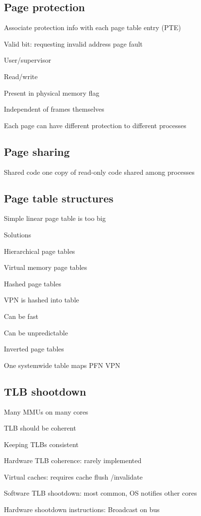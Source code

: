 \subsection{Page protection}
\enumstart
	\item Associate protection info with each page table entry (PTE)
	\enumstart
		\item Valid bit: requesting invalid address \arrow page fault
		\item User/supervisor
		\item Read/write
		\item Present in physical memory flag
	\enumend
	\item Independent of frames themselves
	\item Each page can have different protection to different processes
\enumend

\subsection{Page sharing}
\enumstart
	\item Shared code \arrow one copy of read-only code shared among processes
\enumend

\subsection{Page table structures}
\enumstart
	\item Simple linear page table is too big
	\item Solutions
	\enumstart
		\item Hierarchical page tables
		\item Virtual memory page tables
		\item Hashed page tables
		\enumstart
			\item VPN is hashed into table
			\item Can be fast
			\item Can be unpredictable
		\enumend
		\item Inverted page tables
		\enumstart
			\item One systemwide table maps PFN \arrow VPN
		\enumend
	\enumend
\enumend

\subsection{TLB shootdown}
\enumstart
	\item Many MMUs on many cores
	\item TLB should be coherent
	\item Keeping TLBs consistent
	\enumstart
		\item Hardware TLB coherence: rarely implemented
		\item Virtual caches: requires cache flush /invalidate
		\item Software TLB shootdown: most common, OS notifies other cores
		\item Hardware shootdown instructions: Broadcast on bus
	\enumend
\enumend
